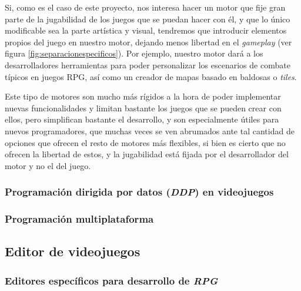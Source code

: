 Si, como es el caso de este proyecto, nos interesa hacer un motor que fije gran parte de la jugabilidad de los juegos que se puedan hacer con él, y que lo único modificable sea la parte artística y visual, tendremos que introducir elementos propios del juego en nuestro motor, dejando menos libertad en el \textit{gameplay} (ver figura \ref{fig:separacionespecificos}). Por ejemplo, nuestro motor dará a los desarrolladores herramientas para poder personalizar los escenarios de combate típicos en juegos RPG, así como un creador de mapas basado en baldosas o \textit{tiles}. 

\smallskip

Este tipo de motores son mucho más rígidos a la hora de poder implementar nuevas funcionalidades y limitan bastante los juegos que se pueden crear con ellos, pero simplifican bastante el desarrollo, y son especialmente útiles para nuevos programadores, que muchas veces se ven abrumados ante tal cantidad de opciones que ofrecen el resto de motores más flexibles, si bien es cierto que no ofrecen la libertad de estos, y la jugabilidad está fijada por el desarrollador del motor y no el del juego. \cite{LaTeXWikipedia}

\subsubsection{Programación dirigida por datos (\textit{DDP}) en videojuegos}

\subsubsection{Programación multiplataforma}

\subsection{Editor de videojuegos}

\subsubsection{Editores específicos para desarrollo de \textit{RPG}}

